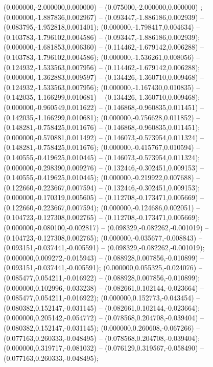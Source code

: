  (0.000000,-2.000000,0.000000) -- (0.075000,-2.000000,0.000000) ;
 (0.000000,-1.887836,0.002967) -- (0.093447,-1.886186,0.002939) -- (0.083795,-1.952818,0.001401);
 (0.000000,-1.798417,0.004634) -- (0.103783,-1.796102,0.004586) -- (0.093447,-1.886186,0.002939);
 (0.000000,-1.681853,0.006360) -- (0.114462,-1.679142,0.006288) -- (0.103783,-1.796102,0.004586);
 (0.000000,-1.536261,0.008056) -- (0.124932,-1.533563,0.007956) -- (0.114462,-1.679142,0.006288);
 (0.000000,-1.362883,0.009597) -- (0.134426,-1.360710,0.009468) -- (0.124932,-1.533563,0.007956);
 (0.000000,-1.167430,0.010835) -- (0.142035,-1.166299,0.010681) -- (0.134426,-1.360710,0.009468);
 (0.000000,-0.960549,0.011622) -- (0.146868,-0.960835,0.011451) -- (0.142035,-1.166299,0.010681);
 (0.000000,-0.756628,0.011852) -- (0.148281,-0.758425,0.011676) -- (0.146868,-0.960835,0.011451);
 (0.000000,-0.570881,0.011492) -- (0.146073,-0.573954,0.011324) -- (0.148281,-0.758425,0.011676);
 (0.000000,-0.415767,0.010594) -- (0.140555,-0.419625,0.010445) -- (0.146073,-0.573954,0.011324);
 (0.000000,-0.298390,0.009276) -- (0.132446,-0.302451,0.009153) -- (0.140555,-0.419625,0.010445);
 (0.000000,-0.219922,0.007688) -- (0.122660,-0.223667,0.007594) -- (0.132446,-0.302451,0.009153);
 (0.000000,-0.170319,0.005605) -- (0.112708,-0.173471,0.005669) -- (0.122660,-0.223667,0.007594);
 (0.000000,-0.124686,0.002051) -- (0.104723,-0.127308,0.002765) -- (0.112708,-0.173471,0.005669);
 (0.000000,-0.080100,-0.002817) -- (0.098329,-0.082262,-0.001019) -- (0.104723,-0.127308,0.002765);
 (0.000000,-0.035677,-0.008843) -- (0.093151,-0.037441,-0.005591) -- (0.098329,-0.082262,-0.001019);
 (0.000000,0.009272,-0.015943) -- (0.088928,0.007856,-0.010899) -- (0.093151,-0.037441,-0.005591);
 (0.000000,0.055325,-0.024076) -- (0.085477,0.054211,-0.016922) -- (0.088928,0.007856,-0.010899);
 (0.000000,0.102996,-0.033238) -- (0.082661,0.102144,-0.023664) -- (0.085477,0.054211,-0.016922);
 (0.000000,0.152773,-0.043454) -- (0.080382,0.152147,-0.031145) -- (0.082661,0.102144,-0.023664);
 (0.000000,0.205142,-0.054772) -- (0.078568,0.204708,-0.039404) -- (0.080382,0.152147,-0.031145);
 (0.000000,0.260608,-0.067266) -- (0.077163,0.260333,-0.048495) -- (0.078568,0.204708,-0.039404);
 (0.000000,0.319717,-0.081032) -- (0.076129,0.319567,-0.058490) -- (0.077163,0.260333,-0.048495);
